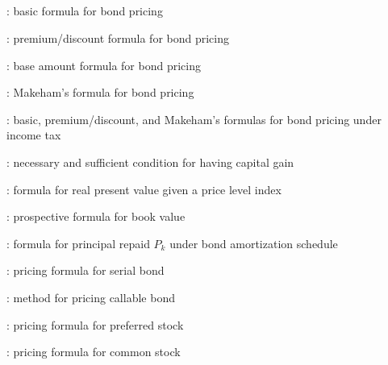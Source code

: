 \subsection*{}
\item {}: basic formula for bond pricing
\item {}: premium/discount formula for bond pricing
\item {}: base amount formula for bond pricing
\item {}: Makeham's formula for bond pricing
\item {}: basic, premium/discount, and Makeham's formulas for bond pricing under income tax
\item {}: necessary and sufficient condition for having capital gain
\item {}: formula for real present value given a price level index
\item {}: prospective formula for book value
\item {}: formula for principal repaid \(P_k\) under bond amortization schedule
\item {}: pricing formula for serial bond
\item {}: method for pricing callable bond
\item {}: pricing formula for preferred stock
\item {}: pricing formula for common stock
